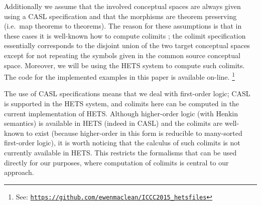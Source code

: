 Additionally we assume that the involved conceptual spaces are always
given using a CASL specification \parencite{MoHaSaTa08} and that the
morphisms are theorem preserving (i.e.\ map theorems to theorems).
The reason for these assumptions is that in these cases
it is well-known how to compute colimits \parencite{Mo98a}; the colimit
specification essentially corresponds to the disjoint union of the two
target conceptual spaces except for not repeating the symbols given in
the common source conceptual space.  Moreover, we will be using the
HETS system \parencite{MossakowskiEA06} to compute such colimits.
The code for the implemented examples in this paper
is available on-line.%
\footnote{See: \texttt{\url{https://github.com/ewenmaclean/ICCC2015_hetsfiles}}}

The use of CASL specifications means that we deal with first-order
logic; CASL is supported in the HETS system, and colimits here can be
computed in the current implementation of HETS. Although higher-order
logic (with Henkin semantics) is available in HETS (indeed in CASL)
and the colimits are well-known to exist (because higher-order in this
form is reducible to many-sorted first-order logic), it is worth
noticing that the calculus of such colimits is not currently available
in HETS.  This restricts the formalisms that can be used directly for
our purposes, where computation of colimits is central to our
approach.


